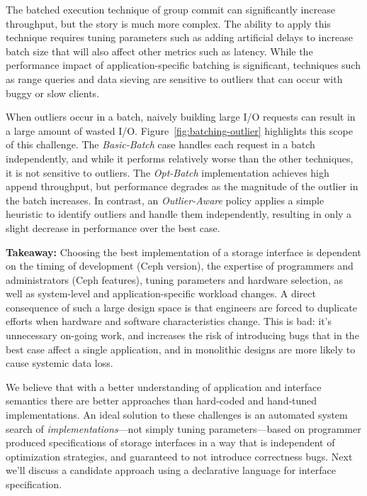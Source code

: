 The batched execution technique of group commit can significantly increase
throughput, but the story is much more complex. The ability to apply this
technique requires tuning parameters such as adding artificial delays to
increase batch size that will also affect other metrics such as latency.
While the performance impact of application-specific batching is significant,
techniques such as range queries and data sieving are sensitive to outliers
that can occur with buggy or slow clients.

When outliers occur in a batch, naively building large I/O requests can result
in a large amount of wasted I/O.  Figure~\ref{fig:batching-outlier} highlights
this scope of this challenge. The \emph{Basic-Batch} case handles each request
in a batch independently, and while it performs relatively worse than the
other techniques, it is not sensitive to outliers. The \emph{Opt-Batch}
implementation achieves high append throughput, but performance degrades as
the magnitude of the outlier in the batch increases. In contrast, an
\emph{Outlier-Aware} policy applies a simple heuristic to identify outliers
and handle them independently, resulting in only a slight decrease in
performance over the best case.

\textbf{Takeaway:} Choosing the best implementation of a storage interface is
dependent on the timing of development (Ceph version), the expertise of
programmers and administrators (Ceph features), tuning parameters and hardware
selection, as well as system-level and application-specific workload changes.
A direct consequence of such a large design space is that engineers are forced
to duplicate efforts when hardware and software characteristics change. This
is bad: it's unnecessary on-going work, and increases the risk of introducing
bugs that in the best case affect a single application, and in monolithic
designs are more likely to cause systemic data loss.

We believe that with a better understanding of application and interface
semantics there are better approaches than hard-coded and hand-tuned
implementations.  An ideal solution to these challenges is an automated system
search of \emph{implementations}---not simply tuning parameters---based on
programmer produced specifications of storage interfaces in a way that is
independent of optimization strategies, and guaranteed to not introduce
correctness bugs. Next we'll discuss a candidate approach using a declarative
language for interface specification.
